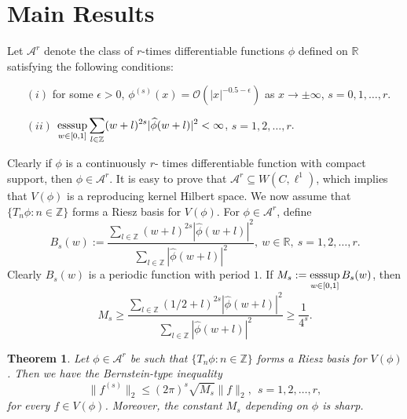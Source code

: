 \documentclass[a4paper,12pt,reqno]{amsart}
\theoremstyle{plain}
\newtheorem{thm}{Theorem}[section]
\numberwithin{equation}{section}
\theoremstyle{definition}
\newcommand{\ds}{\displaystyle}
\begin{document}
\section{Main Results}
Let $\mathcal{A}^r$ denote the class of $r$-times differentiable functions $\phi$ defined on $\mathbb{R}$ satisfying the following conditions:
\begin{itemize}
 \item[$(i)$] for some $\epsilon>0$, $\phi^{(s)}(x)=\mathcal{O}(|x|^{-0.5-\epsilon})$ as $x\to\pm\infty$, $s=0,1,\dots,r$.\\
\item [$(ii)$]$\mathop{\rm{esssup}}\limits_{w\in[0,1]}\ds\sum\limits_{l\in\mathbb{Z}}(w+l)^{2s}|\widehat{\phi}(w+l)|^2<\infty$,  $s=1,2,\dots,r$.
\end{itemize}
Clearly if $\phi$ is a continuously $r$- times differentiable function with compact support, then $\phi\in\mathcal{A}^r$. It is easy to prove that $\mathcal{A}^r\subseteq W(C,\ell^1)$,
which implies that $V(\phi)$ is a reproducing kernel Hilbert space.
We now assume that $\{T_n\phi:n\in\mathbb{Z}\}$ forms a Riesz basis for $V(\phi)$.  For $\phi\in\mathcal{A}^r$,  define
\begin{equation}
B_{s}(w):=\dfrac{\sum\limits_{l\in\mathbb{Z}}(w+l)^{2s}|\widehat{\phi}(w+l)|^2}{\sum\limits_{l\in\mathbb{Z}}|\widehat{\phi}(w+l)|^2},~w\in\mathbb{R},~s=1,2,\dots,r.
\end{equation}
Clearly $B_{s}(w)$ is a periodic function with period $1$.
If $M_{s}:=\mathop{\rm{esssup}}\limits_{w\in[0,1]}B_{s}(w)$, then
$$M_s\geq\dfrac{\sum\limits_{l\in\mathbb{Z}}(1/2+l)^{2s}|\widehat{\phi}(w+l)|^2}{\sum\limits_{l\in\mathbb{Z}}|\widehat{\phi}(w+l)|^2}\geq\dfrac{1}{4^s}.$$
\begin{thm}\label{pap4thm2.3}
Let $\phi\in\mathcal{A}^r$ be such that $\{T_{n}\phi:n\in\mathbb{Z}\}$ forms a Riesz basis for $V(\phi)$.
Then we have the Bernstein-type inequality
\begin{equation}\label{pap7eqn3.2}
\|f^{(s)}\|_2\leq(2\pi)^{s}\sqrt{M_{s}}\|f\|_2,~~s=1,2,\dots,r,
\end{equation}
for every $f\in V(\phi)$. Moreover, the constant $M_s$ depending on $\phi$ is sharp.
\end{thm}
\end{document}
